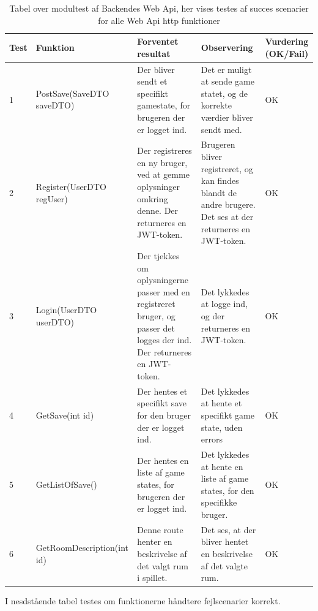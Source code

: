 \begin{table}[H]
\label{table: succes}
\caption{Tabel over modultest af Backendes Web Api, her vises testes af succes scenarier for alle Web Api http funktioner }%
\begin{tabular}{|p{0.75cm}|p{3.6cm}|p{3.5cm}|p{3.5cm}|p{1.9cm}|} \hline
 \textbf{Test} & \textbf{Funktion} & \textbf{Forventet resultat} & \textbf{Observering} & \textbf{Vurdering} \textbf{(OK/Fail)}\\\hline
 1 & PostSave(SaveDTO saveDTO) & Der bliver sendt et specifikt gamestate, for brugeren der er logget ind. & Det er muligt at sende game statet, og de korrekte værdier bliver sendt med. & OK \\ \hline
 2 & Register(UserDTO regUser) & Der registreres en ny bruger, ved at gemme oplysninger omkring denne. Der returneres en JWT-token. & Brugeren bliver registreret, og kan findes blandt de andre brugere. Det ses at der returneres en JWT-token. & OK \\ \hline
 3 & Login(UserDTO userDTO) & Der tjekkes om oplysningerne passer med en registreret bruger, og passer det logges der ind. Der returneres en JWT-token. & Det lykkedes at logge ind, og der returneres en JWT-token.  & OK \\ \hline
 4 & GetSave(int id) & Der hentes et specifikt save for den bruger der er logget ind. & Det lykkedes at hente et specifikt game state, uden errors  & OK \\ \hline
 5 & GetListOfSave() & Der hentes en liste af game states, for brugeren der er logget ind. & Det lykkedes at hente en liste af game states, for den specifikke bruger. & OK \\ \hline
 6 & GetRoomDescription(int id) & Denne route henter en beskrivelse af det valgt rum i spillet. & Det ses, at der bliver hentet en beskrivelse af det valgte rum. & OK \\ \hline
\end{tabular}
\end{table}

I nesdstående tabel \label{table: fejl} testes om funktionerne håndtere fejlscenarier korrekt.

